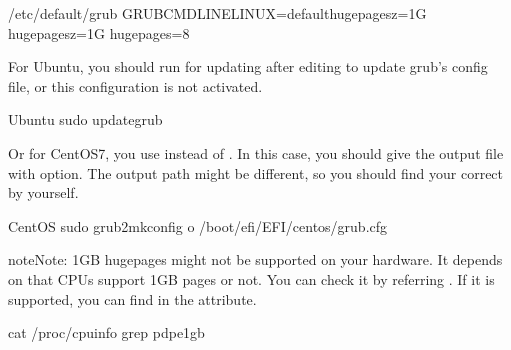 \documentclass[a4paper,11pt,openany,oneside,english]{sphinxmanual}
\begin{document}
\begin{sphinxVerbatim}[commandchars=\\\{\},formatcom=\footnotesize]
\PYGZsh{} /etc/default/grub
GRUB\PYGZus{}CMDLINE\PYGZus{}LINUX=\PYGZdq{}default\PYGZus{}hugepagesz=1G hugepagesz=1G hugepages=8\PYGZdq{}
\end{sphinxVerbatim}

For Ubuntu, you should run  for updating
 after editing to update grub’s
config file, or this configuration is not activated.

\begin{sphinxVerbatim}[commandchars=\\\{\},formatcom=\footnotesize]
 Ubuntu
 sudo update\PYGZhy{}grub
\end{sphinxVerbatim}

Or for CentOS7, you use  instead of .
In this case, you should give the output file with  option.
The output path might be different, so you should find your correct
 by yourself.

\begin{sphinxVerbatim}[commandchars=\\\{\},formatcom=\footnotesize]
 CentOS
 sudo grub2\PYGZhy{}mkconfig \PYGZhy{}o /boot/efi/EFI/centos/grub.cfg
\end{sphinxVerbatim}

\begin{sphinxadmonition}{note}{Note:}
1GB hugepages might not be supported on your hardware.
It depends on that CPUs support 1GB pages or not. You can check it
by referring . If it is supported, you can find
 in the  attribute.

\begin{sphinxVerbatim}[commandchars=\\\{\},formatcom=\footnotesize]
 cat /proc/cpuinfo  grep pdpe1gb
\end{sphinxVerbatim}
\end{sphinxadmonition}
\end{document}
